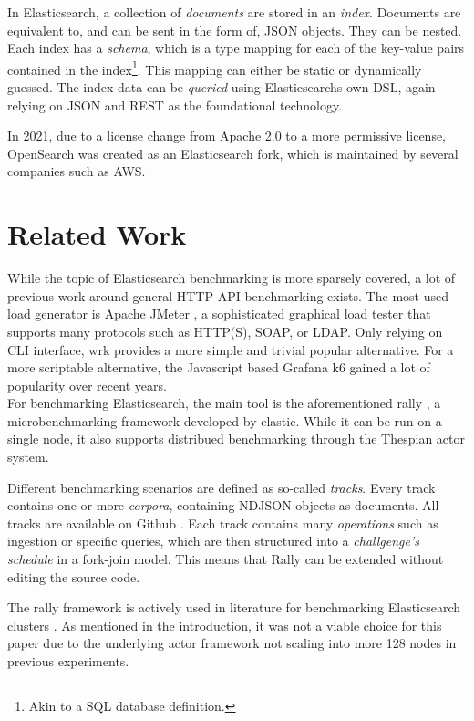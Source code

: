 In Elasticsearch, a collection of \emph{documents} are stored in an \emph{index}. Documents are equivalent to, and can be sent in the form of, \ac{JSON} objects. They can be nested. Each index has a \emph{schema}, which is a type mapping for each of the key-value pairs contained in the index\footnote{Akin to a SQL database definition.}. This mapping can either be static or dynamically guessed. The index data can be \emph{queried} using Elasticsearchs own \ac{DSL}, again relying on \ac{JSON} and REST as the foundational technology.

In 2021, due to a license change from Apache 2.0 to a more permissive license, OpenSearch was created as an Elasticsearch fork, which is maintained by several companies such as AWS.

\section{Related Work}
While the topic of Elasticsearch benchmarking is more sparsely covered, a lot of previous work around general HTTP API benchmarking exists. The most used load generator is Apache JMeter \cite{jmeter}, a sophisticated graphical load tester that supports many protocols such as HTTP(S), SOAP, or LDAP. Only relying on \ac{CLI} interface, wrk \cite{wrk} provides a more simple and trivial popular alternative. For a more scriptable alternative, the Javascript based Grafana k6 \cite{k6} gained a lot of popularity over recent years.\\

For benchmarking Elasticsearch, the main tool is the aforementioned rally \cite{rally}, a microbenchmarking framework developed by elastic. While it can be run on a single node, it also supports distribued benchmarking through the Thespian actor system.

Different benchmarking scenarios are defined as so-called \emph{tracks}. Every track contains one or more \emph{corpora}, containing \ac{NDJSON} objects as documents. All tracks are available on Github \cite{rallytracks}. Each track contains many \emph{operations} such as ingestion or specific queries, which are then structured into a \emph{challgenge's} \emph{schedule} in a fork-join model. This means that Rally can be extended without editing the source code.

The rally framework is actively used in literature for benchmarking Elasticsearch clusters \cite{rallyusecase1} \cite{rallyusecase2} \cite{rallyusecase3}. As mentioned in the introduction, it was not a viable choice for this paper due to the underlying actor framework not scaling into more 128 nodes in previous experiments.\\

